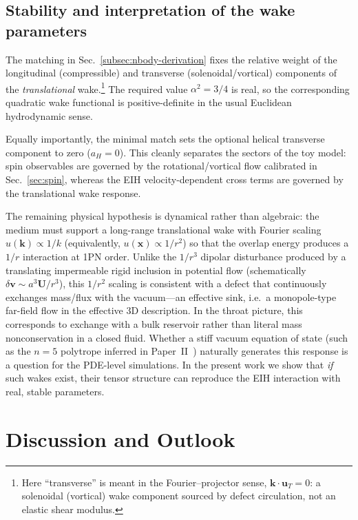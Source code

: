 \documentclass[11pt]{article}
\begin{document}
\subsection{Stability and interpretation of the wake parameters}
\label{subsec:nbody-signature}

The matching in Sec.~\ref{subsec:nbody-derivation} fixes the relative weight
of the longitudinal (compressible) and transverse (solenoidal/vortical) components of the
\emph{translational} wake.\footnote{Here ``transverse'' is meant in the Fourier--projector sense, $\mathbf{k}\cdot\mathbf{u}_T=0$: a solenoidal (vortical) wake component sourced by defect circulation, not an elastic shear modulus.}  The required value $\alpha^2=3/4$ is real, so the
corresponding quadratic wake functional is positive-definite in the usual
Euclidean hydrodynamic sense.

Equally importantly, the minimal match sets the optional helical transverse
component to zero ($a_H=0$).  This cleanly separates the sectors of the toy
model: spin observables are governed by the rotational/vortical flow
calibrated in Sec.~\ref{sec:spin}, whereas the EIH velocity-dependent cross
terms are governed by the translational wake response.

The remaining physical hypothesis is dynamical rather than algebraic:
the medium must support a long-range translational wake with Fourier scaling
$u(\mathbf{k})\propto 1/k$ (equivalently, $u(\mathbf{x})\propto 1/r^2$) so that
the overlap energy produces a $1/r$ interaction at 1PN order.
Unlike the $1/r^3$ dipolar disturbance produced by a translating impermeable rigid
inclusion in potential flow (schematically $\delta\mathbf{v}\sim a^3\mathbf{U}/r^3$), this
$1/r^2$ scaling is consistent with a defect that continuously exchanges mass/flux
with the vacuum---an effective sink, i.e.\ a monopole-type far-field flow in the effective 3D description.
In the throat picture, this corresponds to exchange with a bulk reservoir rather
than literal mass nonconservation in a closed fluid.
Whether a stiff vacuum equation of state (such as the $n=5$ polytrope inferred in
Paper~II~\cite{Norris:Paper2}) naturally generates this response is a question
for the PDE-level simulations.  In the present work we show that \emph{if} such
wakes exist, their tensor structure can reproduce the EIH interaction with
real, stable parameters.

\section{Discussion and Outlook}
\label{sec:discussion}
\end{document}
